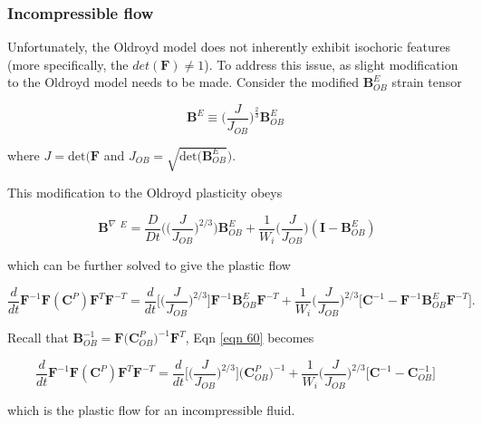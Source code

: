 \documentclass[a4paper]{article}
\begin{document}
\subsubsection{Incompressible flow}

Unfortunately, the Oldroyd model does not inherently exhibit isochoric features (more specifically, the $det(\mathbf{F}) \neq 1$). To address this issue, as slight modification to the Oldroyd model needs to be made. Consider the modified $\mathbf{B}_{OB}^E$ strain tensor

\begin{equation}
    \mathbf{B}^E \equiv \biggl(\frac{J}{J_{OB}}\biggr)^{\frac{2}{3}} \mathbf{B}^E_{OB}
\end{equation}

where $J = \text{det}(\mathbf{F}$ and $J_{OB} = \sqrt{\text{det}(\mathbf{B}_{OB}^E})$. 

This modification to the Oldroyd plasticity obeys

\begin{equation}
    \mathop{\mathbf{B}}^\nabla\limits{}^{E} = \frac{D}{Dt}\Biggl( \biggl(\frac{J}{J_{OB}}\biggr)^{2/3}\Biggr) \mathbf{B}^E_{OB} + \frac{1}{W_i}\biggl(\frac{J}{J_{OB}}\biggr) (\mathbf{I} - \mathbf{B}_{OB}^E )
\end{equation}

which can be further solved to give the plastic flow

\begin{equation}\label{eqn 60}
    \frac{d}{dt} \mathbf{F}^{-1}\mathbf{F} (\mathbf{C}^P) \mathbf{F}^T\mathbf{F}^{-T} = \frac{d}{dt}\Biggr[\biggl(\frac{J}{J_{OB}}\biggl)^{2/3}\Biggr] \mathbf{F}^{-1} \mathbf{B}_{OB}^E \mathbf{F}^{-T} + \frac{1}{W_i}\biggl(\frac{J}{J_{OB}}\biggr)^{2/3} \biggr[\mathbf{C}^{-1} - \mathbf{F}^{-1} \mathbf{B}_{OB}^E \mathbf{F}^{-T}\biggr]. 
\end{equation}

Recall that $\mathbf{B}_{OB}^{-1} = \mathbf{F} \biggl(\mathbf{C}_{OB}^P \biggr)^{-1} \mathbf{F}^T$, Eqn \ref{eqn 60} becomes

\begin{equation}
    \boxed{\frac{d}{dt} \mathbf{F}^{-1}\mathbf{F} (\mathbf{C}^P) \mathbf{F}^T\mathbf{F}^{-T} = \frac{d}{dt}\Biggr[\biggl(\frac{J}{J_{OB}}\biggl)^{2/3}\Biggr] \biggl(\mathbf{C}_{OB}^P \biggr)^{-1} + \frac{1}{W_i}\biggl(\frac{J}{J_{OB}}\biggr)^{2/3} \biggr[\mathbf{C}^{-1} - \mathbf{C}_{OB}^{-1}\biggr]}
\end{equation}

which is the plastic flow for an incompressible fluid. 
\end{document}
